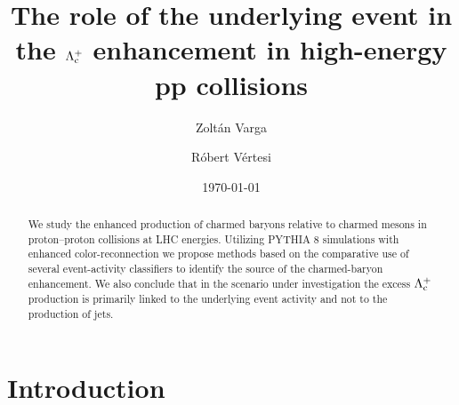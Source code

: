 \documentclass[aps,amsmath,amssymb,a4paper,11pt,superscriptaddress]{revtex4-2}
\newcommand*{\Lc}{\ensuremath{\Lambda_{\rm c}^+}\xspace}
\begin{document}

\title[]{The role of the underlying event in the \Lc enhancement in high-energy pp collisions}%

\author{Zolt\'{a}n Varga}
%
%
\author{R\'{o}bert V\'ertesi}
%

\date{\today}%

\begin{abstract}
We study the enhanced production of charmed baryons relative to charmed mesons in proton--proton collisions at LHC energies. Utilizing PYTHIA 8 simulations with enhanced color-reconnection we propose methods based on the comparative use of several event-activity classifiers to identify the source of the charmed-baryon enhancement. We also conclude that in the scenario under investigation the excess \Lc production is primarily linked to the underlying event activity and not to the production of jets.
\end{abstract}


\maketitle

\section{Introduction}
\label{sec:introduction}
\end{document}
